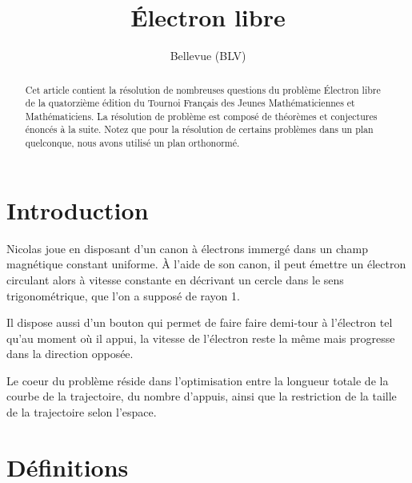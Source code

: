 \documentclass{amsart}
\theoremstyle{definition}
\theoremstyle{remark}
\numberwithin{equation}{section}
\begin{document}
\title{Électron libre}

\author{Bellevue (BLV)}

\begin{abstract}
  Cet article contient la résolution de nombreuses questions du problème \og Électron libre \fg{} de la quatorzième édition du Tournoi Français
  des Jeunes Mathématiciennes et Mathématiciens. La résolution de problème est composé de théorèmes et conjectures énoncés à la suite.
  Notez que pour la résolution de certains problèmes dans un plan quelconque, nous avons utilisé un plan orthonormé.

\end{abstract}

\maketitle

\tableofcontents

\section{Introduction}

Nicolas joue en disposant d’un canon à électrons immergé dans un champ magnétique constant uniforme. À l'aide de son canon, il peut émettre un électron
circulant alors à vitesse constante en décrivant un cercle dans le sens trigonométrique, que l'on a supposé de rayon 1.

Il dispose aussi d’un bouton qui permet de faire faire demi-tour à l’électron tel qu'au moment où il appui, la vitesse de l’électron reste la même
mais progresse dans la direction opposée.

Le coeur du problème réside dans l'optimisation entre la longueur totale de la courbe de la trajectoire, du nombre d'appuis, ainsi que la restriction
de la taille de la trajectoire selon l'espace.\newpage
\section{Définitions}
\end{document}
